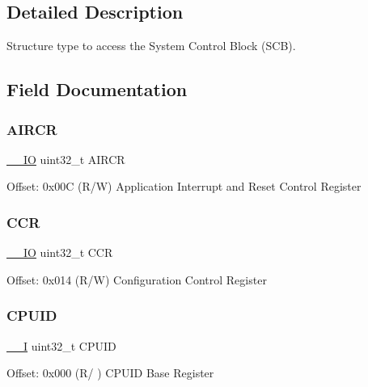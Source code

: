 \subsection{Detailed Description}
Structure type to access the System Control Block (S\+CB). 

\subsection{Field Documentation}
\mbox{\label{struct_s_c_b___type_aaec159b48828355cb770049b8b2e8d91}} 
\subsubsection{\texorpdfstring{AIRCR}{AIRCR}}
{\footnotesize\ttfamily \mbox{\hyperlink{core__cm0plus_8h_aec43007d9998a0a0e01faede4133d6be}{\+\_\+\+\_\+\+IO}} uint32\+\_\+t A\+I\+R\+CR}

Offset\+: 0x00C (R/W) Application Interrupt and Reset Control Register \mbox{\label{struct_s_c_b___type_a5e1322e27c40bf91d172f9673f205c97}} 
\subsubsection{\texorpdfstring{CCR}{CCR}}
{\footnotesize\ttfamily \mbox{\hyperlink{core__cm0plus_8h_aec43007d9998a0a0e01faede4133d6be}{\+\_\+\+\_\+\+IO}} uint32\+\_\+t C\+CR}

Offset\+: 0x014 (R/W) Configuration Control Register \mbox{\label{struct_s_c_b___type_a30abfea43143a424074f682bd61eace0}} 
\subsubsection{\texorpdfstring{CPUID}{CPUID}}
{\footnotesize\ttfamily \mbox{\hyperlink{core__cm0plus_8h_af63697ed9952cc71e1225efe205f6cd3}{\+\_\+\+\_\+I}} uint32\+\_\+t C\+P\+U\+ID}

Offset\+: 0x000 (R/ ) C\+P\+U\+ID Base Register \mbox{\label{struct_s_c_b___type_a8fec9e122b923822e7f951cd48cf1d47}} 

